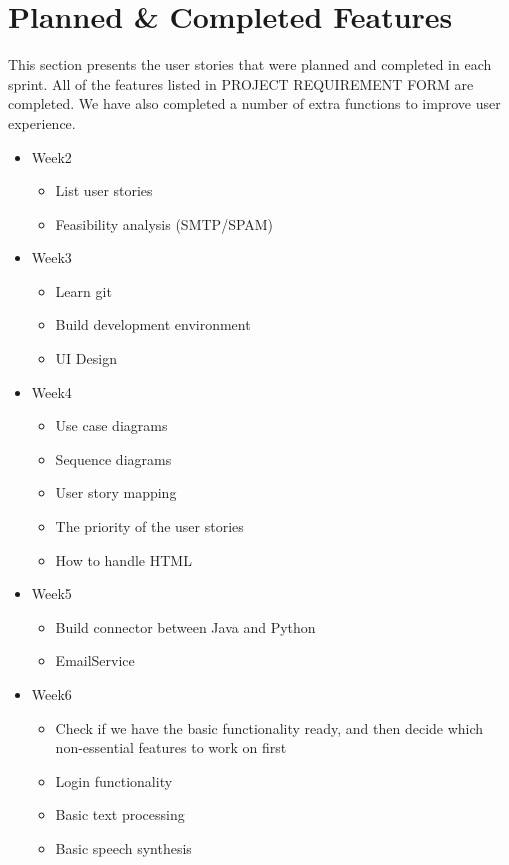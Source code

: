 \documentclass{article}
\begin{document}
\section{Planned \& Completed Features}
This section presents the user stories that were planned and completed in each sprint. All of the features listed in PROJECT REQUIREMENT FORM are completed. We have also completed a number of extra functions to improve user experience.
\begin{itemize}
    \item Week2
    \begin{itemize}
        \item List user stories
        \item Feasibility analysis (SMTP/SPAM)
    \end{itemize}
    \item Week3
    \begin{itemize}
        \item Learn git
        \item Build development environment
        \item UI Design
    \end{itemize}
    \item  Week4 
    \begin{itemize}
        \item Use case diagrams
        \item Sequence diagrams
        \item User story mapping
        \item The priority of the user stories
        \item How to handle HTML
    \end{itemize}
    \item Week5
    \begin{itemize}
        \item Build connector between Java and Python
        \item EmailService
    \end{itemize}
    \item Week6 
    \begin{itemize}
        \item Check if we have the basic functionality ready, and then decide which non-essential features to work on first
        \item Login functionality
        \item Basic text processing
        \item Basic speech synthesis

\end{itemize}
\end{itemize}
\end{document}
